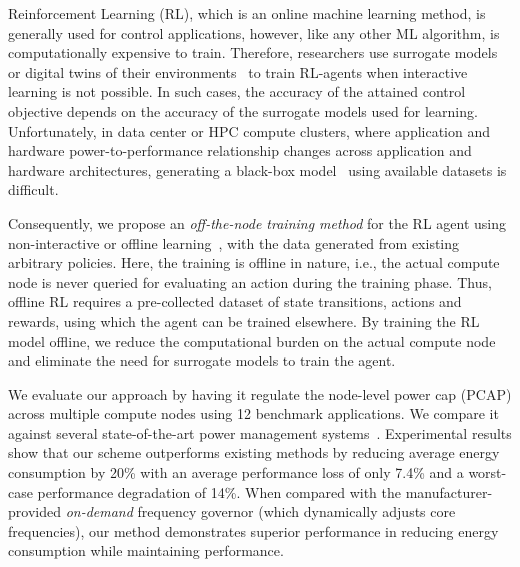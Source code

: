 Reinforcement Learning (RL), which is an online machine learning method, is generally used for control applications, however, like any other ML algorithm, is computationally expensive to train. Therefore, researchers use surrogate models or digital twins of their environments~\cite{10305814} to train RL-agents when interactive learning is not possible. In such cases, the accuracy of the attained control objective depends on the accuracy of the surrogate models used for learning. Unfortunately, in data center or HPC compute clusters, where application and hardware power-to-performance relationship changes across application and hardware architectures, generating a black-box model~\cite{WITT201933} using available datasets is difficult. 

Consequently, we propose an \emph{off-the-node training method} for the RL agent using non-interactive or offline learning~\cite{levine2020offline}, with the data generated from existing arbitrary policies.
Here, the training is offline in nature, i.e., the actual compute node is never queried for evaluating an action during the training phase. Thus, offline RL requires a pre-collected dataset of state transitions, actions and rewards, using which the agent can be trained elsewhere. By training the RL model offline, we reduce the computational burden on the actual compute node and eliminate the need for surrogate models to train the agent.

We evaluate our approach by having it regulate the node-level power cap (PCAP) across multiple compute nodes using 12 benchmark applications. We compare it against several state-of-the-art power management systems~\cite{autoPM,zhangenergy,cerf2021sustaining}. Experimental results show that our scheme outperforms existing methods by reducing average energy consumption by 20\% with an average performance loss of only 7.4\% and a worst-case performance degradation of 14\%. When compared with the manufacturer-provided \textit{on-demand} frequency governor (which dynamically adjusts core frequencies), our method demonstrates superior performance in 
reducing energy consumption while maintaining performance.

